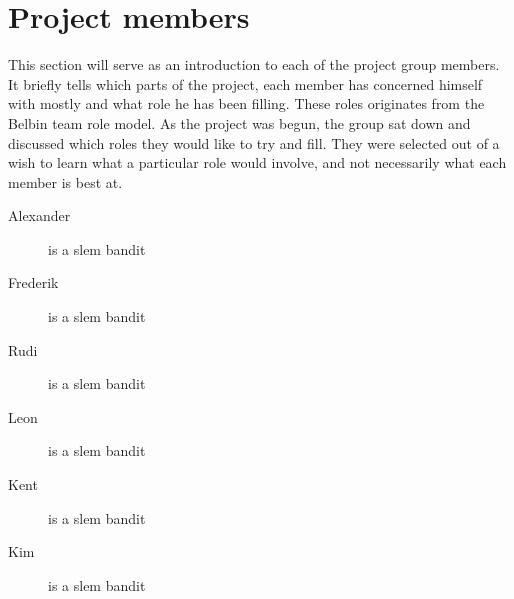 \section{Project members}
This section will serve as an introduction to each of the project group members. It briefly tells which parts of the project, each member has concerned himself with mostly and what role he has been filling. These roles originates from the Belbin team role model. As the project was begun, the group sat down and discussed which roles they would like to try and fill. They were selected out of a wish to learn what a particular role would involve, and not necessarily what each member is best at.

\begin{description}
 \item[Alexander] is a slem bandit
 \item[Frederik] is a slem bandit
 \item[Rudi] is a slem bandit
 \item[Leon] is a slem bandit
 \item[Kent] is a slem bandit
 \item[Kim] is a slem bandit
\end{description}